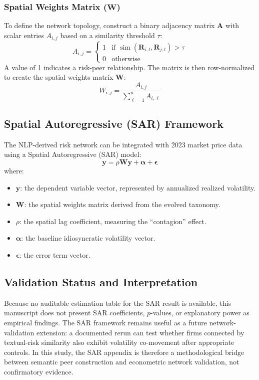 \documentclass[11pt, a4paper]{article}
\begin{document}
\subsubsection{\texorpdfstring{Spatial Weights Matrix ($\mathbf{W}$)}{Spatial Weights Matrix (W)}}
To define the network topology, construct a binary adjacency matrix $\mathbf{A}$ with scalar entries $A_{i,j}$ based on a similarity threshold $\tau$:
\begin{equation}
    A_{i,j} =
    \begin{cases}
      1 & \text{if } \operatorname{sim}(\mathbf{R}_{i,t}, \mathbf{R}_{j,t}) > \tau \\
      0 & \text{otherwise}
    \end{cases}
\end{equation}
A value of 1 indicates a risk-peer relationship. The matrix is then row-normalized to create the spatial weights matrix $\mathbf{W}$:
\begin{equation}
    W_{i,j} = \frac{A_{i,j}}{\sum_{\ell=1}^n A_{i,\ell}}
\end{equation}

\subsection{Spatial Autoregressive (SAR) Framework}
The NLP-derived risk network can be integrated with 2023 market price data using a Spatial Autoregressive (SAR) model:
\begin{equation}
\mathbf{y} = \rho \mathbf{W}\mathbf{y} + \boldsymbol{\alpha} + \boldsymbol{\epsilon}
\end{equation}
where:
\begin{itemize}
\item $\mathbf{y}$: the dependent variable vector, represented by annualized realized volatility.
\item $\mathbf{W}$: the spatial weights matrix derived from the evolved taxonomy.
\item $\rho$: the spatial lag coefficient, measuring the ``contagion'' effect.
\item $\boldsymbol{\alpha}$: the baseline idiosyncratic volatility vector.
\item $\boldsymbol{\epsilon}$: the error term vector.
\end{itemize}

\subsection{Validation Status and Interpretation}
Because no auditable estimation table for the SAR result is available, this manuscript does not present SAR coefficients, $p$-values, or explanatory power as empirical findings. The SAR framework remains useful as a future network-validation extension: a documented rerun can test whether firms connected by textual-risk similarity also exhibit volatility co-movement after appropriate controls. In this study, the SAR appendix is therefore a methodological bridge between semantic peer construction and econometric network validation, not confirmatory evidence.
\end{document}
